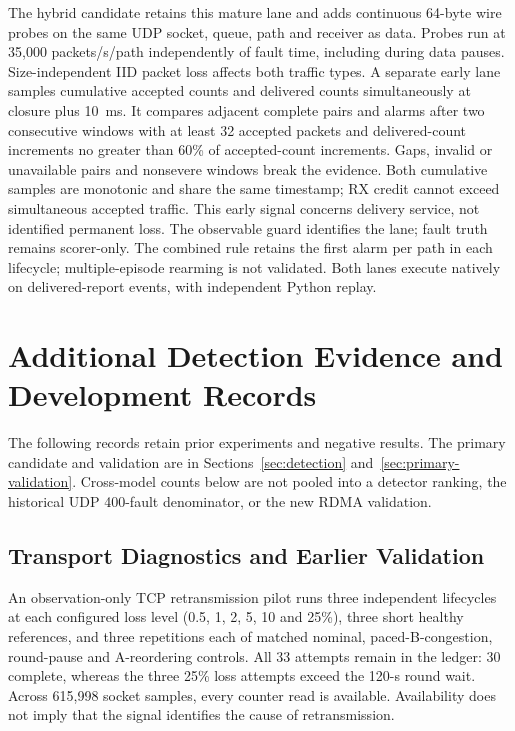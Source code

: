 \documentclass[sigconf]{acmart}
\begin{document}
The hybrid candidate retains this mature lane and adds continuous
64-byte wire probes on the same UDP socket, queue, path and receiver as
data. Probes run at 35,000 packets/s/path independently of fault time,
including during data pauses. Size-independent IID packet loss affects
both traffic types. A separate early lane samples cumulative accepted
counts and delivered counts simultaneously at closure plus 10~ms. It compares
adjacent complete pairs and alarms after two consecutive windows with at
least 32 accepted packets and delivered-count increments no greater than
60\% of accepted-count increments. Gaps, invalid or unavailable pairs and
nonsevere windows break the evidence. Both cumulative samples are monotonic and share the same timestamp;
RX credit cannot exceed simultaneous accepted traffic.
This early signal concerns delivery service, not identified permanent
loss. The observable guard identifies the lane; fault truth remains
scorer-only. The combined rule retains the first alarm per path in each
lifecycle; multiple-episode rearming is not validated. Both lanes execute
natively on delivered-report events, with independent Python replay.

\section{Additional Detection Evidence and Development Records}
\label{app:detection-evidence}
The following records retain prior experiments and negative results.
The primary candidate and validation are in Sections~\ref{sec:detection}
and~\ref{sec:primary-validation}. Cross-model counts below are not pooled
into a detector ranking, the historical UDP 400-fault denominator, or the
new RDMA validation.

\subsection{Transport Diagnostics and Earlier Validation}
An observation-only TCP retransmission pilot runs three independent
lifecycles at each configured loss level (0.5, 1, 2, 5, 10 and 25\%),
three short healthy references, and three repetitions each of matched
nominal, paced-B-congestion, round-pause and A-reordering controls.
All 33 attempts remain in the ledger: 30 complete, whereas the three
25\% loss attempts exceed the 120-s round wait. Across 615,998 socket
samples, every counter read is available. Availability does not imply
that the signal identifies the cause of retransmission.
\end{document}
